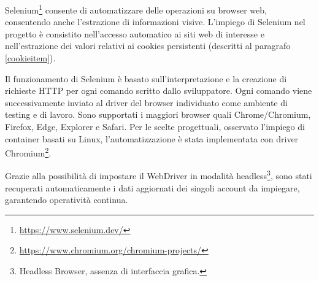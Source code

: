 Selenium\footnote{\url{https://www.selenium.dev/}} consente di automatizzare delle operazioni su browser web, consentendo anche l'estrazione di informazioni visive.\cite{gundecha2015selenium}
L'impiego di Selenium nel progetto \`e consistito nell'accesso automatico ai siti web di interesse e nell'estrazione dei valori relativi ai cookies persistenti (descritti al paragrafo \ref{cookieitem}). 

Il funzionamento di Selenium \`e basato sull'interpretazione e la creazione di richieste HTTP per ogni comando scritto dallo sviluppatore. Ogni comando viene successivamente inviato al driver del browser individuato come ambiente di testing e di lavoro. Sono supportati i maggiori browser quali Chrome/Chromium, Firefox, Edge, Explorer e Safari. 
Per le scelte progettuali, osservato l'impiego di container basati su Linux, l'automatizzazione \`e stata implementata con driver Chromium\footnote{\url{https://www.chromium.org/chromium-projects/}}.

Grazie alla possibilit\`a di impostare il WebDriver in modalit\`a headless\footnote{Headless Browser, assenza di interfaccia grafica.}, sono stati recuperati automaticamente i dati aggiornati dei singoli account da impiegare, garantendo operativit\`a continua.


